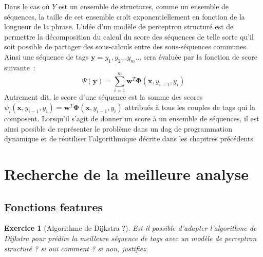 \documentclass[11pt,openany]{book}
\newtheorem{exo}{Exercice}[chapter]
\newcommand{\ac}[1]{{\sc #1}} %
\begin{document}
Dans le cas où $Y$ est un ensemble de structures, comme un ensemble de
séquences, la taille de cet ensemble croît exponentiellement en
fonction de la longueur de la phrase. 
L'idée d'un modèle de perceptron structuré est de permettre la
décomposition du calcul du score des séquences de telle sorte qu'il
soit possible de partager des sous-calculs entre des sous-séquences communes.
Ainsi une séquence de tags $\mathbf{y} = y_1,y_2\ldots y_m\ldots $
sera évaluée par la fonction de score suivante~:
\begin{equation}
\Psi(\mathbf{y}) = \sum_{i=1}^m \mathbf{w}^T \boldsymbol\Phi(\mathbf{x},y_{i-1},y_i)
\end{equation}
Autrement dit, le score d'une séquence est la somme des scores 
$\psi_i(\mathbf{x}, y_{i-1},y_i) = \mathbf{w}^T \boldsymbol\Phi(\mathbf{x},y_{i-1},y_i)$
attribués à tous les couples de tags qui la composent. Lorsqu'il
s'agit de donner un score à un ensemble de séquences, il est ainsi
possible de représenter le problème dans un \ac{dag} de programmation
dynamique et de réutiliser l'algorithmique décrite dans les chapitres précédents.




\section{Recherche de la meilleure analyse}

\subsection{Fonctions features}


\begin{exo}[Algorithme de Dijkstra ?]
Est-il possible d'adapter l'algorithme de Dijkstra pour prédire la
meilleure séquence de tags avec un modèle de perceptron structuré ?
si oui comment ? si non, justifiez.
\end{exo}
\end{document}
